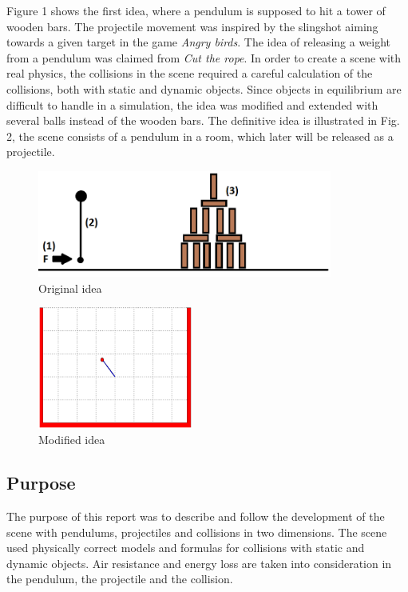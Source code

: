 \documentclass[a4paper,12pt,twoside,english]{article}
\begin{document}
Figure 1 shows the first idea, where a pendulum is supposed to hit a tower of wooden bars. The projectile movement was inspired by the slingshot aiming towards a given target in the game {\itshape Angry birds}. The idea of releasing a weight from a pendulum was claimed from {\itshape Cut the rope}. In order to create a scene with real physics, the collisions in the scene required a careful calculation of the collisions, both with static and dynamic objects. Since objects in equilibrium are difficult to handle in a simulation, the idea was modified and extended with several balls instead of the wooden bars. The definitive idea is illustrated in Fig. 2, the scene consists of a pendulum in a room, which later will be released as a projectile.


\begin{figure}[h]
\includegraphics[height=3.5cm]{bilder/ideasketch.png}
\centering
\caption{Original idea}
\end{figure}
\begin{figure}[h]
\includegraphics[height=4cm]{bilder/Matlab_Pendulum1.png}
\centering
\caption{Modified idea}
\end{figure} 



\subsection{Purpose}
The purpose of this report was to describe and follow the development of the scene with pendulums, projectiles and collisions in two dimensions. The scene used physically correct models and formulas for collisions with static and dynamic objects. Air resistance and energy loss are taken into consideration in the pendulum, the projectile and the collision.
\end{document}
